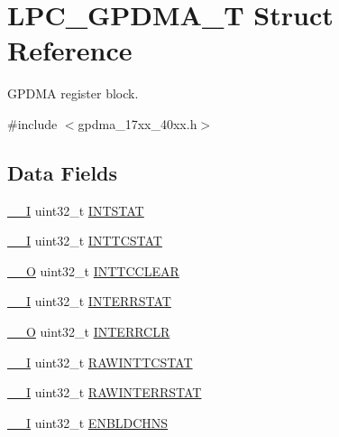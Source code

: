 \hypertarget{structLPC__GPDMA__T}{\section{L\-P\-C\-\_\-\-G\-P\-D\-M\-A\-\_\-\-T Struct Reference}
\label{structLPC__GPDMA__T}
}


G\-P\-D\-M\-A register block.  




{\ttfamily \#include $<$gpdma\-\_\-17xx\-\_\-40xx.\-h$>$}

\subsection*{Data Fields}
\begin{DoxyCompactItemize}
\item 
\hyperlink{core__cm3_8h_af63697ed9952cc71e1225efe205f6cd3}{\-\_\-\-\_\-\-I} uint32\-\_\-t \hyperlink{structLPC__GPDMA__T_a744123eb8ee989a3c80570160cd0b91b}{I\-N\-T\-S\-T\-A\-T}
\item 
\hyperlink{core__cm3_8h_af63697ed9952cc71e1225efe205f6cd3}{\-\_\-\-\_\-\-I} uint32\-\_\-t \hyperlink{structLPC__GPDMA__T_a2ca8f15773342988a28ba333cf73c380}{I\-N\-T\-T\-C\-S\-T\-A\-T}
\item 
\hyperlink{core__cm3_8h_a7e25d9380f9ef903923964322e71f2f6}{\-\_\-\-\_\-\-O} uint32\-\_\-t \hyperlink{structLPC__GPDMA__T_a85a79ad19b52d9017a2fd7b15349a168}{I\-N\-T\-T\-C\-C\-L\-E\-A\-R}
\item 
\hyperlink{core__cm3_8h_af63697ed9952cc71e1225efe205f6cd3}{\-\_\-\-\_\-\-I} uint32\-\_\-t \hyperlink{structLPC__GPDMA__T_a6d563f8fa43b98a42090d51698735727}{I\-N\-T\-E\-R\-R\-S\-T\-A\-T}
\item 
\hyperlink{core__cm3_8h_a7e25d9380f9ef903923964322e71f2f6}{\-\_\-\-\_\-\-O} uint32\-\_\-t \hyperlink{structLPC__GPDMA__T_ae278f6d236ca389e9aa9a8bcd68ba063}{I\-N\-T\-E\-R\-R\-C\-L\-R}
\item 
\hyperlink{core__cm3_8h_af63697ed9952cc71e1225efe205f6cd3}{\-\_\-\-\_\-\-I} uint32\-\_\-t \hyperlink{structLPC__GPDMA__T_a215d6f79819ceb03fd00ecae1324a7c8}{R\-A\-W\-I\-N\-T\-T\-C\-S\-T\-A\-T}
\item 
\hyperlink{core__cm3_8h_af63697ed9952cc71e1225efe205f6cd3}{\-\_\-\-\_\-\-I} uint32\-\_\-t \hyperlink{structLPC__GPDMA__T_ae4bf6971c867a0892da2cf449c341122}{R\-A\-W\-I\-N\-T\-E\-R\-R\-S\-T\-A\-T}
\item 
\hyperlink{core__cm3_8h_af63697ed9952cc71e1225efe205f6cd3}{\-\_\-\-\_\-\-I} uint32\-\_\-t \hyperlink{structLPC__GPDMA__T_aa35d28a63f29b0e098d8e40dc294049a}{E\-N\-B\-L\-D\-C\-H\-N\-S}

\end{DoxyCompactItemize}

